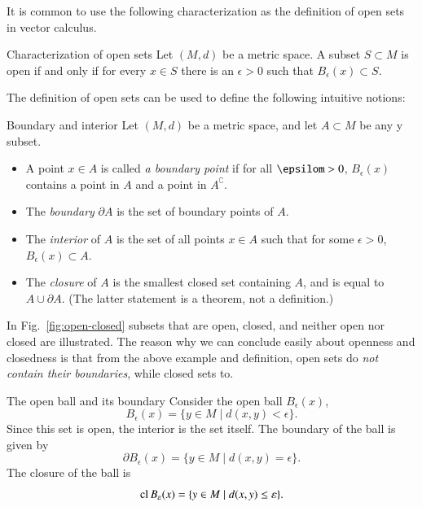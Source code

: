It is common to use the following characterization as the definition of open sets in vector calculus.
\begin{myTheorem}{Characterization of open sets}{}
    Let $(M,d)$ be a metric space. A subset $S\subset M$ is open if and only if for every $x\in S$ there is an $\epsilon>0$ such that $B_\epsilon(x) \subset S$.
\end{myTheorem}

The definition of open sets can be used to define the following intuitive notions:
\begin{myDefinition}{Boundary and interior}{}
 Let $(M,d)$ be a metric space, and let $A \subset M$ be any
 y subset.
 \begin{itemize}
     \item 
     A point $x\in A$ is called \emph{a boundary point} if for all $\epsilom>0$, $B_\epsilon(x)$ contains a point in $A$ and a point in $A^\complement$.
    \item
     The \emph{boundary} $\partial A$ is the set of boundary points of $A$.
    \item
     The \emph{interior} of $A$ is the set of all points $x\in A$ such that for some $\epsilon>0$, $B_\epsilon(x) \subset A$.
    \item  The \emph{closure} of $A$ is the smallest closed set containing $A$, and is equal to $A \cup \partial A$. (The latter statement is a theorem, not a definition.)
 \end{itemize}
\end{myDefinition}

In Fig.~\ref{fig:open-closed} subsets that are open, closed, and neither open nor closed are illustrated. The reason why we can conclude easily about openness and closedness is that from the above example and definition, open sets do \emph{not contain their boundaries}, while closed sets to. 

\begin{myExample}{The open ball and its boundary}{}
Consider the open ball $B_\epsilon(x)$,
$$ B_\epsilon(x) = \{ y \in M \mid d(x,y) < \epsilon \} . $$
Since this set is open, the interior is the set itself.
The boundary of the ball is given by
$$ \partial B_\epsilon(x) = \{ y \in M \mid d(x,y) = \epsilon \} . $$
The closure of the ball is
$$ \operatorname{cl} B_\varepsilon(x) = \{ y \in M \mid d(x,y) \leq \varepsilon \} . $$
\end{myExample}

